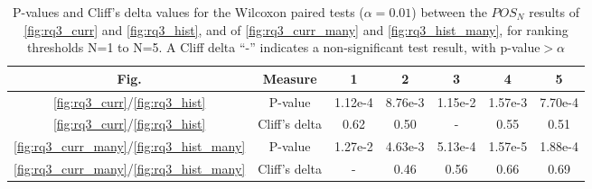 
\begin{table}[t]
 \begin{tabular}{c c c c c c c} 
Fig. & Measure & 1 & 2 & 3 & 4 & 5 \\
 \hline
\ref{fig:rq3_curr}/\ref{fig:rq3_hist} & P-value & 1.12e-4 & 8.76e-3 & 1.15e-2 & 1.57e-3 & 7.70e-4 \\
      \ref{fig:rq3_curr}/\ref{fig:rq3_hist}& Cliff's delta & 0.62 & 0.50 & - & 0.55 & 0.51 \\
\ref{fig:rq3_curr_many}/\ref{fig:rq3_hist_many} &  P-value & 1.27e-2 & 4.63e-3 & 5.13e-4 & 1.57e-5 & 1.88e-4 \\
   \ref{fig:rq3_curr_many}/\ref{fig:rq3_hist_many}& Cliff's delta & - & 0.46 & 0.56 & 0.66 & 0.69 \\
\end{tabular}
\caption{P-values and Cliff's delta values for the Wilcoxon paired tests ($\alpha=0.01$) between the $POS_N$ results of \autoref{fig:rq3_curr} and \autoref{fig:rq3_hist}, and of \autoref{fig:rq3_curr_many} and \autoref{fig:rq3_hist_many}, for ranking thresholds N=1 to N=5. A Cliff delta ``-'' indicates a non-significant test result, with p-value$>\alpha$}
\label{table:rq3_wilc_loc_cc}
\end{table}






